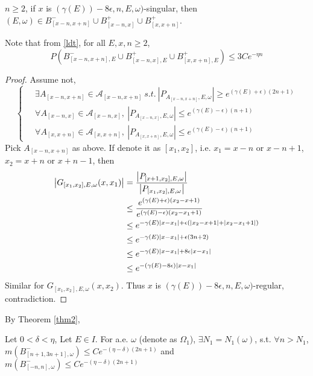 \begin{lemma}\label{lemma1}
 $n \geq 2$, if $x$ is $(\gamma(E))-8\epsilon,n,E,\omega)$-singular, then $(E,\omega)\in B_{[x-n,x+n]}^-\cup B_{[x-n,x]}^+\cup B_{[x,x+n]}^+$.
\end{lemma}
\begin{remark}
  Note that from \eqref{ldt}, for all $E,x,n\geq 2$,
  \[
    P(B_{[x-n,x+n],E}^-\cup B_{[x-n,x],E}^+\cup B_{[x,x+n],E}^+)\leq 3Ce^{-\eta n}
  \]
\end{remark}
\begin{proof}
Assume not,
\[
  \left\{
  \begin{aligned}
    &~\exists A_{[x-n,x+n]}\in\mathcal{A}_{[x-n,x+n]}~s.t.~ |P_{A_{[x-n,x+n]},E,\omega}|\geq e^{(\gamma(E)+\epsilon)(2n+1)}\\
    &~\forall A_{[x-n,x]}\in\mathcal{A}_{[x-n,x]},~ |P_{A_{[x-n,x]},E,\omega}|\leq e^{(\gamma(E)-\epsilon)(n+1)}\\
    &~\forall A_{[x,x+n]}\in\mathcal{A}_{[x,x+n]},~ |P_{A_{[x,x+n]},E,\omega}|\leq e^{(\gamma(E)-\epsilon)(n+1)}
  \end{aligned}
  \right.
\]
Pick $A_{[x-n,x+n]}$ as above. If denote it as $[x_1,x_2]$, i.e. $x_1= x-n$ or $x-n+1$, $x_2=x+n$ or $x+n-1$, then
\[
  \begin{aligned}
    \left\vert G_{[x_1,x_2],E,\omega}(x,x_1)\right\vert
    &=  \frac{\left\vert P_{[x+1,x_2],E,\omega}\right\vert}{\left\vert P_{[x_1,x_2],E,\omega}\right\vert}\\
    &\leq  \frac{e^{(\gamma(E)+\epsilon)(x_2-x+1)}}{e^{(\gamma(E)-\epsilon)(x_2-x_1+1)}}\\
    &\leq  e^{-\gamma(E)\lvert x-x_1\rvert+\epsilon(\lvert x_2-x+1\rvert+\lvert x_2-x_1+1\rvert)}\\
    &\leq  e^{-\gamma(E)\lvert x-x_1\rvert+\epsilon(3n+2)}\\
    &\leq  e^{-\gamma(E)\lvert x-x_1\rvert+8\epsilon\lvert x-x_1\rvert}\\
    &\leq  e^{-(\gamma(E)-8\epsilon)\lvert x-x_1\rvert}
  \end{aligned}
\]
Similar for $G_{[x_1,x_2],E,\omega}(x,x_2)$.
Thus $x$ is $(\gamma(E))-8\epsilon, n, E,\omega)$-regular, contradiction.
\end{proof}

By Theorem \ref{thm2},

\begin{thm}
  Let $0<\delta<\eta$, Let $E\in I$. For a.e. $\omega$ (denote as $\Omega_1$), $\exists N_1=N_1(\omega)$, s.t. $\forall n>N_1$, $m(B_{[n+1,3n+1],\omega}^-)\leq Ce^{-(\eta-\delta)(2n+1)}$ and $m(B_{[-n,n],\omega}^-)\leq Ce^{-(\eta-\delta)(2n+1)}$
\end{thm}

